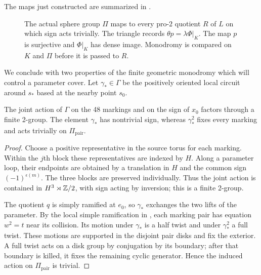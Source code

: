 The maps just constructed are summarized in .
\begin{figure}[htbp]
\centering
{}
\caption{The actual sphere group $\Pi$ maps to every pro-$2$ quotient
$R$ of $L$ on which sign acts trivially. The triangle records
$\theta p=\lambda\Phi|_K$. The map $p$ is surjective and $\Phi|_K$
has dense image. Monodromy is compared on $K$ and $\Pi$ before it is
passed to $R$.}
\label{fig:group-maps}
\end{figure}


We conclude with two properties of the finite geometric monodromy
which will control a parameter cover.  Let $\gamma_*\in\Gamma$ be
the positively oriented local circuit around $s_*$ based at the
nearby point $s_0$.

\begin{lemma}\label{lem:finite-geometric-monodromy}
The joint action of $\Gamma$ on the 48 markings and on the sign
of $x_0$ factors through a finite 2-group.  The element
$\gamma_*$ has nontrivial sign, whereas $\gamma_*^2$ fixes every
marking and acts trivially on $\Pi_{\mathrm{pair}}$.
\end{lemma}

\begin{proof}
Choose a positive representative in the source torus for each
marking.  Within the $j$th block these representatives are indexed
by $H$.  Along a parameter loop, their endpoints are obtained by
a translation in $H$ and the common sign $(-1)^{\epsilon(m)}$.
The three blocks are preserved individually.  Thus the joint action
is contained in $H^3\rtimes\mathbb Z/2$, with sign acting by inversion;
this is a finite 2-group.

The quotient $q$ is simply ramified at $e_0$, so $\gamma_*$
exchanges the two lifts of the parameter.  By the local simple
ramification in , each marking pair has equation
$w^2=t$ near its collision.  Its motion under $\gamma_*$ is a
half twist and under $\gamma_*^2$ a full twist.  These motions
are supported in the disjoint pair disks and fix the exterior.
A full twist acts on a disk group by conjugation by its boundary;
after that boundary is killed, it fixes the remaining cyclic
generator.  Hence the induced action on
$\Pi_{\mathrm{pair}}$ is trivial.
\end{proof}

